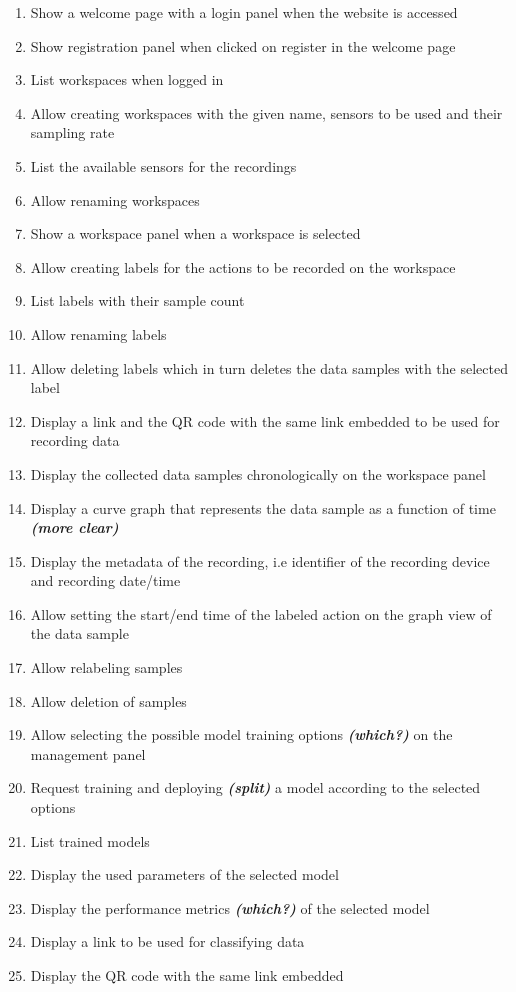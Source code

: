 \begin{enumerate}[{label = \textbf{/F{\protect\twodigits{\arabic{enumi}}}0/}, leftmargin = *}]
    \item \label{/F010/} Show a welcome page with a login panel when the website is accessed
    \item Show registration panel when clicked on register in the welcome page
    \item List workspaces when logged in
    \item Allow creating workspaces with the given name, sensors to be used and their sampling rate
    \item List the available sensors for the recordings
    \item Allow renaming workspaces
    \item Show a workspace panel when a workspace is selected
    \item Allow creating labels for the actions to be recorded on the workspace
    \item List labels with their sample count
    \item Allow renaming labels
    \item Allow deleting labels which in turn deletes the data samples with the selected label
    \item Display a link and the QR code with the same link embedded to be used for recording data
    \item Display the collected data samples chronologically on the workspace panel
    \item Display a curve graph that represents the data sample as a function of time \textbf{\emph{(more clear)}}
    \item Display the metadata of the recording, i.e identifier of the recording device and recording date/time
    \item Allow setting the start/end time of the labeled action on the graph view of the data sample
    \item Allow relabeling samples
    \item Allow deletion of samples
    \item Allow selecting the possible model training options \textbf{\emph{(which?)}} on the management panel 
    \item Request training and deploying \textbf{\emph{(split)}} a model according to the selected options
    \item List trained models
    \item Display the used parameters of the selected model
    \item Display the performance metrics \textbf{\emph{(which?)}} of the selected model
    \item Display a link to be used for classifying data
    \item Display the QR code with the same link embedded
\end{enumerate}

